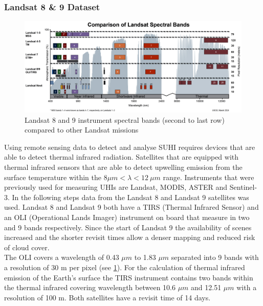 \documentclass[12pt,a4paper, english,twoside]{scrartcl}
\begin{document}
    \subsubsection{Landsat 8 \& 9 Dataset}\label{sec:landsat}
      \begin{figure}[htbp]
       \begin{center}
         \includegraphics[width=\textwidth]{img/LandsatSpectralBands.png}
       \end{center}
       \caption{Landsat 8 and 9 instrument spectral bands (second to last row) compared to other Landsat missions\autocite{USGSWebsite}\label{fig:lsspectral}}
      \end{figure}
      \noindent
      Using remote sensing data to detect and analyse \gls{SUHI} requires devices that are able to detect thermal infrared radiation. 
      Satellites that are equipped with thermal infrared sensors that are able to detect upwelling emission from the surface temperature within the $ 8\mu m < \lambda < 12\ \mu m $ range. 
      Instruments that were previously used for measuring \glspl{UHI} are Landsat, MODIS, ASTER and Sentinel-3. 
      In the following steps data from the Landsat 8 and Landsat 9 satellites was used. 
      Landsat 8 and Landsat 9 both have a TIRS (Thermal Infrared Sensor) and an OLI (Operational Lands Imager) instrument on board that measure in two and 9 bands respectively.
      Since the start of Landsat 9 the availability of scenes increased and the shorter revisit times allow a denser mapping and reduced risk of cloud cover. \\ 
      The OLI covers a wavelength of 0.43 $\mu m$ to 1.83 $\mu m$ separated into 9 bands with a resolution of 30 m per pixel (see \cref{fig:lsspectral}). 
      For the calculation of thermal infrared emission of the Earth's surface the TIRS instrument contains two bands within the thermal infrared covering wavelength between 10.6 $\mu m$ and 12.51 $\mu m$ with a resolution of 100 m.
      Both satellites have a revisit time of 14 days. 
%
\end{document}
